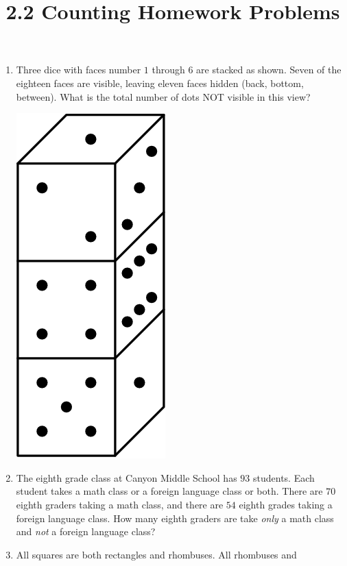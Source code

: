 \documentclass{article}
\title{2.2 Counting Homework Problems}
\author{}
\date{}
\begin{document}
\maketitle

\begin{enumerate}
    \item Three dice with faces number $1$ through $6$ are stacked as shown.
        Seven of the eighteen faces are visible, leaving eleven faces hidden (back, bottom, between).
        What is the total number of dots NOT visible in this view?
        \begin{center}
            \includegraphics[scale=0.25]{dice-tower.png}
        \end{center}
        \vspace{3cm}
    \item The eighth grade class at Canyon Middle School has $93$ students.
        Each student takes a math class or a foreign language class or both.
        There are $70$ eighth graders taking a math class, and there are $54$ eighth grades taking a foreign language class.
        How many eighth graders are take \textit{only} a math class and \textit{not} a foreign language class?
        \vspace{3cm}
    \item All squares are both rectangles and rhombuses. All rhombuses and 

\end{enumerate}
\end{document}
